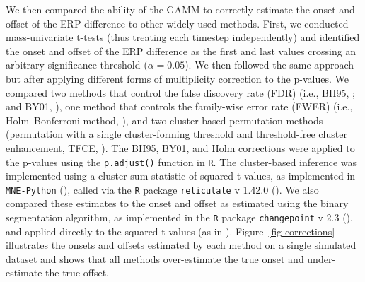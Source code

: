 \documentclass[
  doc,
  floatsintext,
  longtable,
  a4paper,
  nolmodern,
  notxfonts,
  notimes,
  colorlinks=true,linkcolor=blue,citecolor=blue,urlcolor=blue]{apa7}
\begin{document}
We then compared the ability of the GAMM to correctly estimate the onset
and offset of the ERP difference to other widely-used methods. First, we
conducted mass-univariate t-tests (thus treating each timestep
independently) and identified the onset and offset of the ERP difference
as the first and last values crossing an arbitrary significance
threshold (\(\alpha = 0.05\)). We then followed the same approach but
after applying different forms of multiplicity correction to the
p-values. We compared two methods that control the false discovery rate
(FDR) (i.e., BH95, ; and BY01, ), one method that controls the family-wise error rate (FWER)
(i.e., Holm--Bonferroni method, ),
and two cluster-based permutation methods (permutation with a single
cluster-forming threshold and threshold-free cluster enhancement, TFCE,
). The BH95, BY01,
and Holm corrections were applied to the p-values using the
\texttt{p.adjust()} function in \texttt{R}. The cluster-based inference
was implemented using a cluster-sum statistic of squared t-values, as
implemented in \texttt{MNE-Python}
(), called via the \texttt{R}
package \texttt{reticulate} v 1.42.0 (). We also compared these estimates to the onset and offset as
estimated using the binary segmentation algorithm, as implemented in the
\texttt{R} package \texttt{changepoint} v 2.3
(), and applied directly
to the squared t-values (as in
).
Figure~\ref{fig-corrections} illustrates the onsets and offsets
estimated by each method on a single simulated dataset and shows that
all methods over-estimate the true onset and under-estimate the true
offset.
\end{document}
